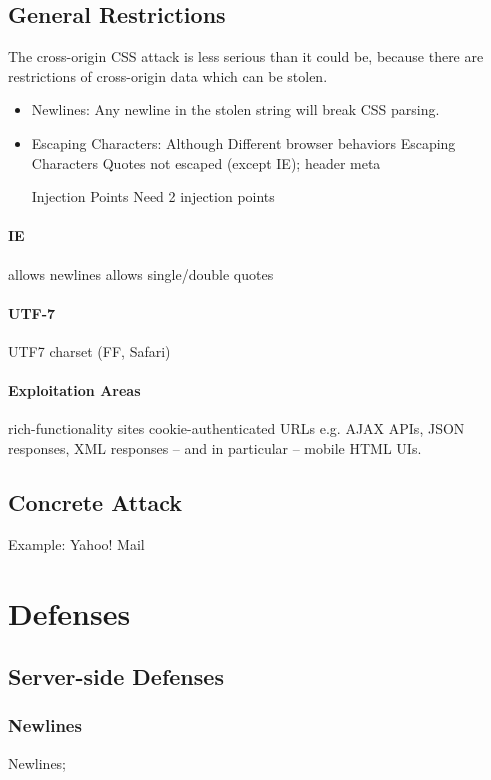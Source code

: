 \documentclass{acm_proc_article-sp}
\begin{document}
\subsection{General Restrictions}
The cross-origin CSS attack is less serious than it could be, because there are restrictions of cross-origin data which can be stolen.
\begin{itemize}

\item{Newlines:}
Any newline in the stolen string will break CSS parsing.

\item{Escaping Characters:}
Although Different browser behaviors
Escaping Characters
Quotes not escaped (except IE);
header meta

Injection Points
Need 2 injection points
\end{itemize}

\paragraph{IE}
allows newlines
allows single/double quotes

\paragraph{UTF-7}
UTF7 charset (FF, Safari)

\paragraph{Exploitation Areas}
rich-functionality sites
cookie-authenticated URLs
e.g. AJAX APIs, JSON responses, XML responses -- and in particular -- mobile HTML UIs.

\subsection{Concrete Attack}
Example: Yahoo! Mail

\section{Defenses}

\subsection{Server-side Defenses}
\subsubsection{Newlines}
Newlines;
\end{document}
